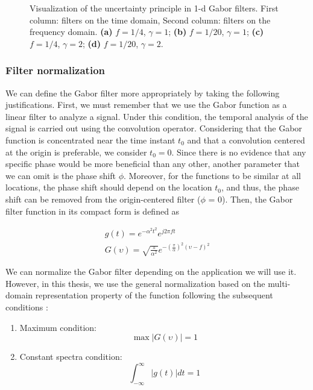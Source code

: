 \documentclass[journal]{IEEEtran}
\newcommand{\captext}[1]{\small{\textbf{\textsf{#1}}}}
\begin{document}
\begin{figure}[!ht]
  	\caption{Visualization of the uncertainty principle in 1-d Gabor filters. First column: filters on the time domain, Second column: filters on the frequency domain. \captext{(a)} $f = 1/4$, $\gamma = 1$; \captext{(b)} $f = 1/20$, $\gamma = 1$; \captext{(c)} $f = 1/4$, $\gamma = 2$; \captext{(d)} $f = 1/20$, $\gamma = 2$.}
  \label{fig:examples_1D_GaborFilter}
\end{figure}

\subsubsection{Filter normalization} \label{subsec:filter_normalization}
We can define the Gabor filter more appropriately by taking the following justifications. First, we must remember that we use the Gabor function as a linear filter to analyze a signal. Under this condition, the temporal analysis of the signal is carried out using the convolution operator. Considering that the Gabor function is concentrated near the time instant $t_0$ and that a convolution centered at the origin is preferable, we consider $t_0 = 0$. Since there is no evidence that any specific phase would be more beneficial than any other, another parameter that we can omit is the phase shift $\phi$. Moreover, for the functions to be similar at all locations, the phase shift should depend on the location $t_0$, and thus, the phase shift can be removed from the origin-centered filter ($\phi$ = 0). Then, the Gabor filter function in its compact form is defined as 

\begin{equation}\label{eq:gabor_function_1d_timefreq_compact}
    \begin{gathered}
         g(t) =  e ^{-\alpha^2 t^2} e ^{j 2 \pi f t } \\
         G(\upsilon) =  \sqrt{\frac{\pi}{\alpha^2}} e ^{-\left(\frac{\pi}{\alpha}\right) ^{2} (\upsilon-f)^2} 
     \end{gathered}
\end{equation}

We can normalize the Gabor filter depending on the application we will use it. However, in this thesis, we use the general normalization based on the multi-domain representation property of the function following the subsequent conditions \cite{Boukerroui.Noble.ea:JMIV:2004}:

\begin{enumerate}
    \item Maximum condition:
        \begin{equation}\label{eq:maximun_condition}
            \max{|G(\upsilon)|} = 1
        \end{equation}
    \item Constant spectra condition:
        \begin{equation}\label{eq:constant_spectrum_condition}
            \int_{-\infty}^{\infty} |g(t)| dt = 1
        \end{equation}        
\end{enumerate}
\end{document}
